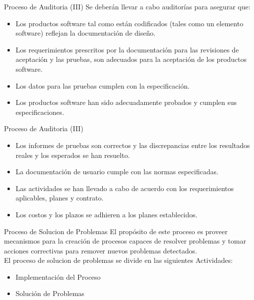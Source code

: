 \documentclass{beamer}
\begin{document}
			\begin{frame}{Proceso de Auditoria (III)}
			Se deberán llevar a cabo auditorías para asegurar que:\pause
				\begin{itemize}
					\item Los productos software tal como están codificados (tales como un elemento software) reflejan la documentación de diseño.\pause
					\item Los requerimientos prescritos por la documentación para las revisiones de aceptación y las pruebas, son adecuados para la aceptación de los productos software.\pause
					\item Los datos para las pruebas cumplen con la especificación.\pause
					\item Los productos software han sido adecuadamente probados y cumplen sus especificaciones.
				\end{itemize}						
			\end{frame}
			
			\begin{frame}{Proceso de Auditoria (III)}
				\begin{itemize}
					\item Los informes de pruebas son correctos y las discrepancias entre los resultados reales y los esperados se han resuelto.\pause
					\item La documentación de usuario cumple con las normas especificadas.\pause
					\item Las actividades se han llevado a cabo de acuerdo con los requerimientos aplicables, planes y contrato.\pause
					\item Los costos y los plazos se adhieren a los planes establecidos.
				\end{itemize}
			\end{frame}
			
			\begin{frame}{Proceso de Solucion de Problemas}
				El propósito de este proceso es proveer mecanismos para la creación de procesos capaces de resolver problemas y tomar acciones correctivas para remover nuevos problemas detectados.\\
				
				El proceso de solucion de problemas se divide en las siguientes Actividades:\pause
				
				\begin{itemize}
					\item Implementación del Proceso\pause
					\item Solución de Problemas
				\end{itemize}			 
			\end{frame}
			
\end{document}
